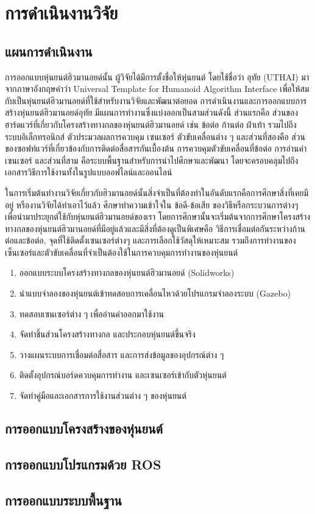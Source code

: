 \chapter{การดำเนินงานวิจัย}
\section{แผนการดำเนินงาน}
การออกแบบหุ่นยนต์ฮิวมานอยด์นั้น ผู้วิจัยได้มีการตั้งชื่อให้หุ่นยนต์ โดยใช้ชื่อว่า อุทัย (UTHAI)
มาจากภาษาอังกฤษคำว่า Universal Template for Humanoid Algorithm Interface
เพื่อให้สมกับเป็นหุ่นยนต์ฮิวมานอยด์ที่ใช้สำหรับงานวิจัยและพัฒนาต่อยอด
การดำเนินงานและการออกแบบการสร้างหุ่นยนต์ฮิวมานอยด์อุทัย มีแผนการทำงานซึ่งแบ่งออกเป็นสามส่วนดังนี้
ส่วนแรกคือ ส่วนของฮาร์ดแวร์ที่เกี่ยวกับโครงสร้างทางกลของหุ่นยนต์ฮิวมานอยด์ เช่น ข้อต่อ ก้านต่อ ฝ่าเท้า
รวมไปถึงระบบอิเล็กทรอนิกส์ ตัวประมวลผลการควบคุม เซนเซอร์ ตัวขับเคลื่อนต่าง ๆ และส่วนที่สองคือ
ส่วนของซอฟท์แวร์ที่เกี่ยวข้องกับการติดต่อสื่อสารกันเบื้องต้น การควบคุมตัวขับเคลื่อนที่ข้อต่อ การอ่านค่าเซนเซอร์
และส่วนที่สาม คือระบบพื้นฐานสำหรับการนำไปศึกษาและพัฒนา โดยจะครอบคลุมไปถึงเอกสารวิธีการใช้งานทั้งในรูปแบบออฟไลน์และออนไลน์

ในการเริ่มต้นทำงานวิจัยเกี่ยวกับฮิวมานอยด์นั้นสิ่งจำเป็นที่ต้องทำในอันดับแรกคือการศึกษาสิ่งที่เคยมีอยู่ หรืองานวิจัยได้ทำเอาไว้แล้ว
ศึกษาทำความเข้าใจใน ข้อดี-ข้อเสีย ของวิธีหรือกระบวนการต่างๆ เพื่อนำมาประยุกต์ใช้กับหุ่นยนต์ฮิวมานอยด์ของเรา
โดยการศึกษานั้นจะเริ่มต้นจากการศึกษาโครงสร้างทางกลของหุ่นยนต์ฮิวมานอยด์ที่มีอยู่แล้วและมีสิ่งที่ต้องดูเป็นพิเศษคือ
วิธีการเชื่อมต่อกันระหว่างก้านต่อและข้อต่อ, จุดที่ใช้ติดตั้งเซนเซอร์ต่างๆ และการเลือกใช้วัสดุให้เหมาะสม
รวมถึงการทำงานของเซ็นเซอร์และตัวขับเคลื่อนที่จำเป็นต้องใช้ในการควบคุมการทำงานของหุ่นยนต์

\begin{enumerate}
    \item ออกแบบระบบโครงสร้างทางกลของหุ่นยนต์ฮิวมานอยด์ (Solidworks)
    \item นำแบบจำลองของหุ่นยนต์เข้าทดสอบการเคลื่อนไหวด้วยโปรแกรมจำลองระบบ (Gazebo)
    \item ทดสอบเซนเซอร์ต่าง ๆ เพื่ออ่านค่าออกมาใช้งาน
    \item จัดทำชิ้นส่วนโครงสร้างทางกล และประกอบหุ่นยนต์ขึ้นจริง
    \item วางแผนระบบการเชื่อมต่อสื่อสาร และการส่งข้อมูลของอุปกรณ์ต่าง ๆ
    \item ติดตั้งอุปกรณ์บอร์ดควบคุมการทำงาน และเซนเซอร์เข้ากับตัวหุ่นยนต์
    \item จัดทำคู่มือและเอกสารการใช้งานส่วนต่าง ๆ ของหุ่นยนต์ 
\end{enumerate}


\clearpage
\section{การออกแบบโครงสร้างของหุ่นยนต์}


\clearpage
\section{การออกแบบโปรแกรมด้วย ROS}


\clearpage
\section{การออกแบบระบบพื้นฐาน}


